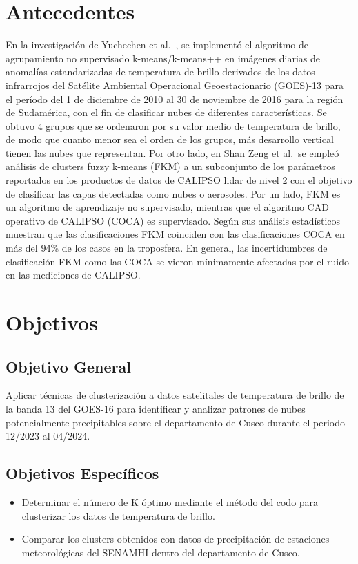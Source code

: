 \documentclass[twocolumn]{IECEjournal} %
\begin{document}
\section{Antecedentes}
En la investigación de Yuchechen et al.~\cite{3}, se implementó el algoritmo de agrupamiento no supervisado k-means/k-means++ en imágenes diarias de anomalías estandarizadas de temperatura de brillo derivados de los datos infrarrojos del Satélite Ambiental Operacional Geoestacionario (GOES)-13 para el período del 1 de diciembre de 2010 al 30 de noviembre de 2016 para la región de Sudamérica, con el fin de clasificar nubes de diferentes características. Se obtuvo 4 grupos que se ordenaron por su valor medio de temperatura de brillo, de modo que cuanto menor sea el orden de los grupos, más desarrollo vertical tienen las nubes que representan. Por otro lado, en Shan Zeng et al.~\cite{4}se empleó análisis de clusters fuzzy k-means (FKM) a un subconjunto de los parámetros reportados en los productos de datos de CALIPSO lidar de nivel 2 con el objetivo de clasificar las capas detectadas como nubes o aerosoles. Por un lado, FKM es un algoritmo de aprendizaje no supervisado, mientras que el algoritmo CAD operativo de CALIPSO (COCA) es supervisado. Según sus análisis estadísticos muestran que las clasificaciones FKM coinciden con las clasificaciones COCA en más del 94\% de los casos en la troposfera. En general, las incertidumbres de clasificación FKM como las COCA se vieron mínimamente afectadas por el ruido en las mediciones de CALIPSO.

\section{Objetivos}
\subsection{Objetivo General}
Aplicar técnicas de clusterización a datos satelitales de temperatura de brillo de la banda 13 del GOES-16 para identificar y analizar patrones de nubes potencialmente precipitables sobre el departamento de Cusco durante el periodo 12/2023 al 04/2024.

\subsection{Objetivos Específicos}
\begin{itemize}
    \item Determinar el número de K óptimo mediante el método del codo para clusterizar los datos de temperatura de brillo.
    \item Comparar los clusters obtenidos con datos de precipitación de estaciones meteorológicas del SENAMHI dentro del departamento de Cusco.
\end{itemize}
\end{document}
